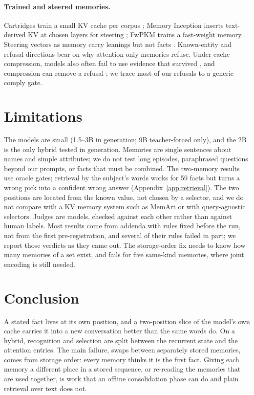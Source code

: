 \documentclass[11pt]{article}
\begin{document}
\paragraph{Trained and steered memories.} Cartridges train a small KV cache per corpus
\citep{eyuboglu2026cartridges}; Memory Inception inserts text-derived KV at chosen layers for steering
\citep{liu2026inception}; FwPKM trains a fast-weight memory \citep{zhao2026fwpkm}. Steering vectors as memory carry
leanings but not facts \citep{jumle2026steering}. Known-entity and refusal directions
\citep{ferrando2025entity,arditi2024refusal} bear on why attention-only memories refuse. Under cache compression,
models also often fail to use evidence that survived \citep{khodabandehlou2026abstention}, and compression can remove
a refusal \citep{kim2025kvzip}; we trace most of our refusals to a generic comply gate.

\section{Limitations}
\label{sec:limits}

The models are small (1.5--3B in generation; 9B teacher-forced only), and the 2B is the only hybrid tested in
generation. Memories are single sentences about names and simple attributes; we do not test long episodes,
paraphrased questions beyond our prompts, or facts that must be combined. The two-memory results use oracle gates;
retrieval by the subject's words works for 59 facts but turns a wrong pick into a confident wrong answer
(Appendix~\ref{app:retrieval}). The two positions are located from the known value, not chosen by a selector, and we do not compare
with a KV memory system such as MemArt or with query-agnostic selectors. Judges are models, checked against each other rather than against human labels. Most
results come from addenda with rules fixed before the run, not from the first pre-registration, and several of their
rules failed in part; we report those verdicts as they came out. The storage-order fix needs to know how many memories
of a set exist, and fails for five same-kind memories, where joint encoding is still needed.

\section{Conclusion}

A stated fact lives at its own position, and a two-position slice of the model's own cache carries it into a new
conversation better than the same words do. On a hybrid, recognition and selection are split between the recurrent
state and the attention entries. The main failure, swaps between separately stored memories, comes from storage
order: every memory thinks it is the first fact. Giving each memory a different place in a stored sequence, or
re-reading the memories that are used together, is work that an offline consolidation phase can do and plain retrieval
over text does not.
\end{document}
